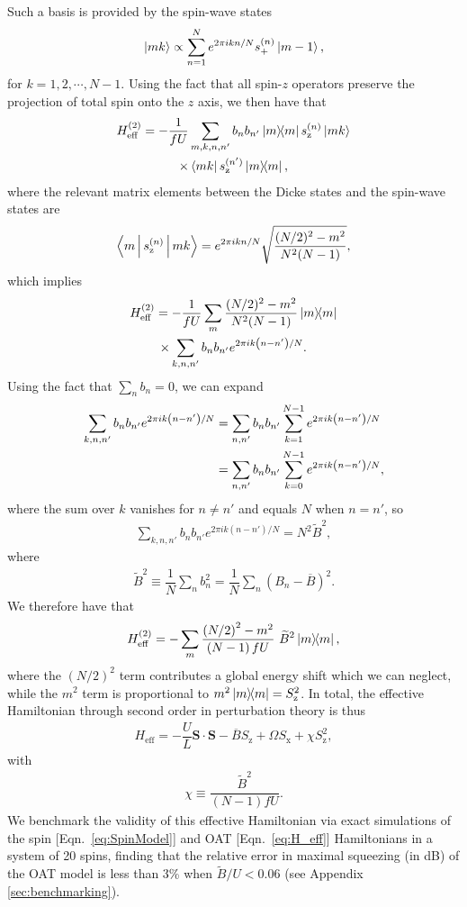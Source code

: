 \documentclass[aps,prx,superscriptaddress,notitlepage,twocolumn,longbibliography]{revtex4-2}
\renewcommand{\t}{\text} %
\newcommand{\f}[2]{\dfrac{#1}{#2}} %
\newcommand{\p}[1]{\left(#1\right)} %
\renewcommand{\c}{\cdot} %
\renewcommand{\v}{\bm} %
\newcommand{\bk}{\Braket}
\renewcommand{\ket}{\Ket}
\renewcommand{\bra}{\Bra}
\newcommand{\z}{\text{z}}
\newcommand{\x}{\text{x}}
\begin{document}
Such a basis is provided by the spin-wave states
\begin{align}
  \ket{mk}
  \propto
  \sum_{n=1}^N e^{2\pi ikn/N} s_+^{(n)} \ket{m-1},
\end{align}
for $k=1,2,\cdots,N-1$\cite{swallows2011suppression}.
Using the fact that all spin-$z$ operators preserve the projection of total spin onto the $z$ axis, we then have that
\begin{multline}
  H_{\t{eff}}^{(2)}
  = -\f1{fU} \sum_{m,k,n,n'} b_n b_{n'}
  \op{m} s_\z^{(n)} \ket{mk} \\
  \times \bra{mk} s_\z^{(n')} \op{m},
  \label{eq:general_H_eff_2}
\end{multline}
where the relevant matrix elements between the Dicke states and the spin-wave states are\cite{swallows2011suppression}
\begin{align}
  \bk{m|s_\z^{(n)}|mk}
  = e^{2\pi i k n/N} \sqrt{\f{(N/2)^2-m^2}{N^2 (N-1)}},
\end{align}
which implies
\begin{multline}
  H_{\t{eff}}^{(2)}
  = -\f1{fU} \sum_m \f{(N/2)^2-m^2}{N^2 (N-1)} \op{m} \\
  \times \sum_{k,n,n'} b_n b_{n'} e^{2\pi ik\p{n-n'}/N}.
\end{multline}
Using the fact that $\sum_nb_n=0$, we can expand
\begin{align}
  \sum_{k,n,n'} b_n b_{n'} e^{2\pi ik\p{n-n'}/N}
  &= \sum_{n,n'} b_n b_{n'} \sum_{k=1}^{N-1} e^{2\pi ik\p{n-n'}/N} \notag \\
  &= \sum_{n,n'} b_n b_{n'} \sum_{k=0}^{N-1} e^{2\pi ik\p{n-n'}/N},
\end{align}
where the sum over $k$ vanishes for $n\ne n'$ and equals $N$ when $n=n'$, so
\begin{align}
  \sum_{k,n,n'} b_n b_{n'} e^{2\pi ik\p{n-n'}/N}
  = N^2 \widetilde B^2,
\end{align}
where
\begin{align}
  \widetilde B^2
  \equiv \f1N \sum_n b_n^2 = \f1N \sum_n \p{B_n - \overline B}^2.
  \label{eq:sum_knn}
\end{align}
We therefore have that
\begin{align}
  H_{\t{eff}}^{(2)}
  = -\sum_m \f{\p{N/2}^2-m^2}{\p{N-1}fU}~ \widetilde B^2 \op{m},
\end{align}
where the $\p{N/2}^2$ term contributes a global energy shift which we can neglect, while the $m^2$ term is proportional to $m^2\op{m}=S_\z^2$.
In total, the effective Hamiltonian through second order in perturbation theory is thus
\begin{align}
  H_{\t{eff}}
  = -\f{U}{L}\v S\c\v S - \overline B S_\z + \Omega S_\x + \chi S_\z^2,
\label{eq:H_OAT}
\end{align}
with
\begin{align}
  \chi \equiv \f{\widetilde B^2}{\p{N-1}fU}.
\end{align}
We benchmark the validity of this effective Hamiltonian via exact simulations of the spin [Eqn.~\eqref{eq:SpinModel}] and OAT [Eqn.~\eqref{eq:H_eff}] Hamiltonians in a system of 20 spins, finding that the relative error in maximal squeezing (in dB) of the OAT model is less than 3\% when $\widetilde{B}/U<0.06$ (see Appendix \ref{sec:benchmarking}).
\end{document}

